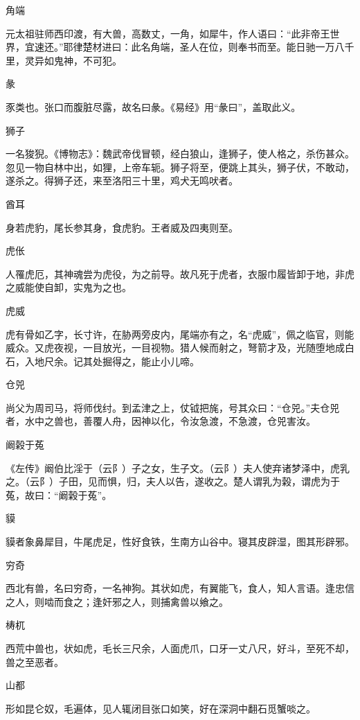 \documentclass[a4paper,12pt,UTF8,twoside]{ctexbook}
\begin{document}
    角端
    
    元太祖驻师西印渡，有大兽，高数丈，一角，如犀牛，作人语曰：“此非帝王世界，宜速还。”耶律楚材进曰：此名角端，圣人在位，则奉书而至。能日驰一万八千里，灵异如鬼神，不可犯。
    
    彖
    
    豕类也。张口而腹脏尽露，故名曰彖。《易经》用“彖曰”，盖取此义。
    
    狮子
    
    一名狻猊。《博物志》：魏武帝伐冒顿，经白狼山，逢狮子，使人格之，杀伤甚众。忽见一物自林中出，如狸，上帝车轭。狮子将至，便跳上其头，狮子伏，不敢动，遂杀之。得狮子还，来至洛阳三十里，鸡犬无鸣吠者。
    
    酋耳
    
    身若虎豹，尾长参其身，食虎豹。王者威及四夷则至。
    
    虎伥
    
    人罹虎厄，其神魂尝为虎役，为之前导。故凡死于虎者，衣服巾履皆卸于地，非虎之威能使自卸，实鬼为之也。
    
    虎威
    
    虎有骨如乙字，长寸许，在胁两旁皮内，尾端亦有之，名“虎威”，佩之临官，则能威众。又虎夜视，一目放光，一目视物。猎人候而射之，弩箭才及，光随堕地成白石，入地尺余。记其处掘得之，能止小儿啼。
    
    仓兕
    
    尚父为周司马，将师伐纣。到孟津之上，仗钺把旄，号其众曰：“仓兕。”夫仓兕者，水中之兽也，善覆人舟，因神以化，令汝急渡，不急渡，仓兕害汝。
    
    阚榖于菟
    
    《左传》阚伯比淫于（云阝）子之女，生子文。（云阝）夫人使弃诸梦泽中，虎乳之。（云阝）子田，见而惧，归，夫人以告，遂收之。楚人谓乳为榖，谓虎为于菟，故曰：“阚榖于菟”。
    
    貘
    
    貘者象鼻犀目，牛尾虎足，性好食铁，生南方山谷中。寝其皮辟湿，图其形辟邪。
    
    穷奇
    
    西北有兽，名曰穷奇，一名神狗。其状如虎，有翼能飞，食人，知人言语。逢忠信之人，则啮而食之；逢奸邪之人，则捕禽兽以飨之。
    
    梼杌
    
    西荒中兽也，状如虎，毛长三尺余，人面虎爪，口牙一丈八尺，好斗，至死不却，兽之至恶者。
    
    山都
    
    形如昆仑奴，毛遍体，见人辄闭目张口如笑，好在深洞中翻石觅蟹啖之。
    
\end{document}
